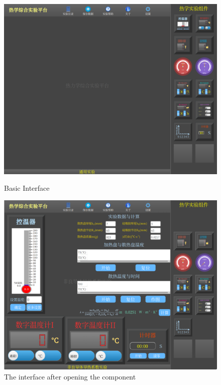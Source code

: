 \documentclass[UTF8]{article}
\begin{document}
		\begin{figure}[H]
			\begin{minipage}[t]{0.5\linewidth}
				\centering
				\includegraphics[clip,scale=0.6,trim={0 4 0 4}]{fig/fig1.png}
				\caption{Basic Interface}
				\label{figure.2}
			\end{minipage}
			\begin{minipage}[t]{0.5\linewidth}
				\centering
				\includegraphics[clip,scale=0.5]{fig/fig2.png}
				\caption{The interface after opening the component}
				\label{figure.3}
			\end{minipage}
		\end{figure}
	    
\end{document}
